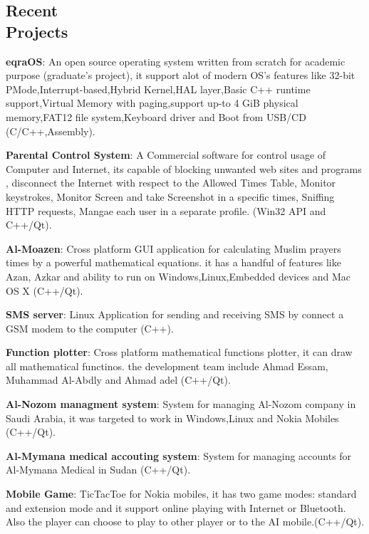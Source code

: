 \documentclass[margin,line]{resume}
\begin{document}
\begin{resume}
    \section{\mysidestyle Recent\\ Projects}

\textbf{eqraOS}: An open source operating system written from scratch for academic purpose (graduate's project), it support alot of modern OS’s features like 32-bit PMode,Interrupt-based,Hybrid Kernel,HAL layer,Basic C++ runtime support,Virtual Memory with paging,support up-to 4 GiB physical memory,FAT12 file system,Keyboard driver and Boot from USB/CD (C/C++,Assembly).
\vspace{-2mm}

\textbf{Parental Control System}: A Commercial software for control usage of Computer and Internet, its capable of blocking unwanted web sites and programs , disconnect the Internet with respect to the Allowed Times Table, Monitor keystrokes, Monitor Screen and take Screenshot in a specific times, Sniffing HTTP requests, Mangae each user in a separate profile. (Win32 API and C++/Qt). 
\vspace{-2mm}

\textbf{Al-Moazen}: Cross platform GUI application for calculating Muslim prayers times by a powerful mathematical equations. it has a handful of features like Azan, Azkar and ability to run on Windows,Linux,Embedded devices and Mac OS X (C++/Qt).
\vspace{-2mm}


\textbf{SMS server}: Linux Application for sending and receiving SMS by connect a GSM modem to the computer (C++).
\vspace{-2mm}

\textbf{Function plotter}: Cross platform mathematical functions plotter, it can draw all mathematical functinos. the development team include Ahmad Essam, Muhammad Al-Abdly and Ahmad adel (C++/Qt).
\vspace{-2mm}

\textbf{Al-Nozom managment system}: System for managing Al-Nozom company in Saudi Arabia, it was targeted to work in Windows,Linux and Nokia Mobiles (C++/Qt).
\vspace{-2mm}

\textbf{Al-Mymana medical accouting system}: System for managing accounts for Al-Mymana Medical in Sudan (C++/Qt).
\vspace{-2mm}

\textbf{Mobile Game}: TicTacToe for Nokia mobiles, it has two game modes: standard and extension mode and it support online playing with Internet or Bluetooth. Also the player can choose to play to other player or to the AI mobile.(C++/Qt).
\vspace{-2mm}


\end{resume}
\end{document}
